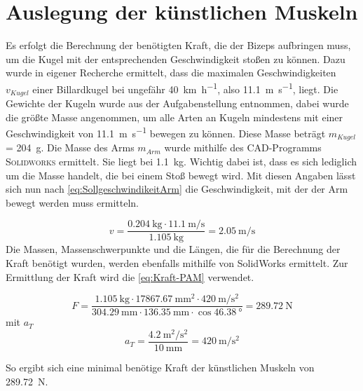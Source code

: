	\section{Auslegung der künstlichen Muskeln}
		Es erfolgt die Berechnung der benötigten Kraft, die der Bizeps aufbringen muss, um die Kugel mit der entsprechenden Geschwindigkeit stoßen zu können. 
		Dazu wurde in eigener Recherche ermittelt, dass die maximalen Geschwindigkeiten \(v_{Kugel}\) einer Billardkugel bei ungefähr \SI{40}{\kilo\metre\per\hour}, also \SI{11,1}{\metre\per\second}, liegt.
		Die Gewichte der Kugeln wurde aus der Aufgabenstellung entnommen, dabei wurde die größte Masse angenommen, um alle Arten an Kugeln mindestens mit einer Geschwindigkeit von \SI{11,1}{\metre\per\second} bewegen zu können.
		Diese Masse beträgt \(m_{Kugel}\) = \SI{204}{\gram}.
		Die Masse des Arms \(m_{Arm}\) wurde mithilfe des CAD-Programms \textsc{Solidworks} ermittelt. Sie liegt bei \SI{1,1}{\kilo\gram}.
		Wichtig dabei ist, dass es sich lediglich um die Masse handelt, die bei einem Stoß bewegt wird. 
		Mit diesen Angaben lässt sich nun nach \cref{eq:SollgeschwindikeitArm} die Geschwindigkeit, mit der der Arm bewegt werden muss ermitteln. 

		\begin{equation}
			v= \frac{\SI{0,204}{\kilogram} \cdot \SI{11,1}{\metre\per\second}}{\SI{1,105}{\kilogram}} = \SI{2,05}{\metre\per\second}
			\label{eq:SollgeschwindikeitArmZahlen}
		\end{equation}
		Die Massen, Massenschwerpunkte und die Längen, die für die Berechnung der Kraft benötigt wurden, werden ebenfalls mithilfe von SolidWorks ermittelt. 
		Zur Ermittlung der Kraft wird die \cref{eq:Kraft-PAM} verwendet. 

		\begin{equation}
			F =\frac{\SI{1,105}{\kilogram} \cdot \SI{17867,67}{\milli\metre\squared} \cdot \SI{420}{\metre\per\second\squared}}{\SI{304,29}{\milli\metre} \cdot \SI{136,35}{\milli\metre} \cdot \cos{\SI{46,38}{\degree}}} = \SI{289,72}{\newton}
		\end{equation}
		mit \(a_T\)
		\begin{equation}
			a_T = \frac{\SI{4,2}{\metre\squared\per\second\squared}}{\SI{10}{\milli\metre}} = \SI{420}{\metre\per\second\squared}
		\end{equation}
		
		So ergibt sich eine minimal benötige Kraft der künstlichen Muskeln von \SI{289,72}{\newton}.